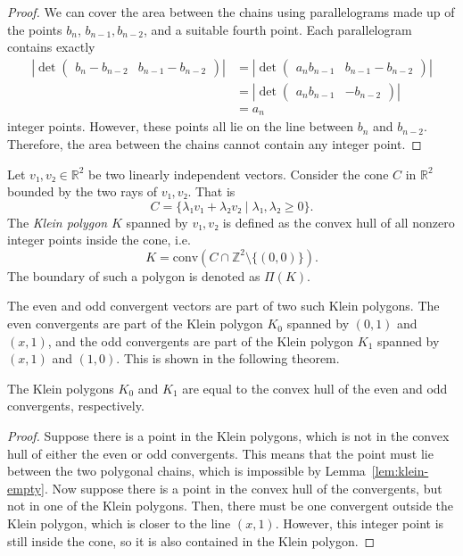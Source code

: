 \begin{proof}
  We can cover the area between the chains
  using parallelograms made up of the points $b_n$, $b_{n-1}, b_{n-2}$, and a suitable fourth point.
  Each parallelogram contains exactly
  \begin{align*}
    |\det\begin{pmatrix}
      b_n - b_{n-2} & b_{n-1} - b_{n-2}
    \end{pmatrix}|
    & = |\det\begin{pmatrix}
      a_n b_{n-1} & b_{n-1} - b_{n-2}
    \end{pmatrix}| \\
    & = |\det\begin{pmatrix}
      a_n b_{n-1} & -b_{n-2}
    \end{pmatrix}| \\
    & = a_n
  \end{align*}
  integer points.
  However, these points all lie on the line between $b_n$ and $b_{n-2}$.
  Therefore, the area between the chains cannot contain any integer point.
\end{proof}

\begin{definition}
  \label{def:klein-polygon}
  Let $v₁, v₂ ∈ ℝ^2$ be two linearly independent vectors.
  Consider the cone $C$ in $ℝ^2$ bounded by the two rays of $v₁, v₂$. That is
  \[
    C = \{ λ₁ v₁ + λ₂ v₂ \mid λ₁, λ₂ ≥ 0 \}.
  \]
  The \emph{Klein polygon} $K$ spanned by $v₁, v₂$ is defined as the convex hull
  of all nonzero integer points inside the cone, i.e.
  \[
    K = \mathrm{conv}(C ∩ ℤ^2 \setminus \{(0, 0)\}).
  \]
  The boundary of such a polygon is denoted as $Π(K)$.
\end{definition}

The even and odd convergent vectors are part of two such Klein polygons.
The even convergents are part of the Klein polygon $K_0$ spanned by $(0, 1)$ and $(x, 1)$,
and the odd convergents are part of the Klein polygon $K_1$ spanned by $(x, 1)$ and $(1, 0)$.
This is shown in the following theorem.

\begin{theorem}
  The Klein polygons $K_0$ and $K_1$ are equal to the
  convex hull of the even and odd convergents, respectively.
\end{theorem}

\begin{proof}
  Suppose there is a point in the Klein polygons,
  which is not in the convex hull of either the even or odd convergents.
  This means that the point must lie between the two polygonal chains,
  which is impossible by Lemma~\ref{lem:klein-empty}.
  Now suppose there is a point in the convex hull of the convergents,
  but not in one of the Klein polygons.
  Then, there must be one convergent outside the Klein polygon,
  which is closer to the line $(x, 1)$.
  However, this integer point is still inside the cone,
  so it is also contained in the Klein polygon.
\end{proof}

